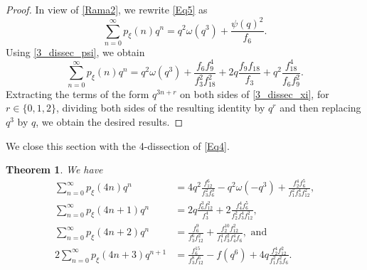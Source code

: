 \documentclass[12pt]{article}
\newtheorem{theorem}{Theorem}[section]
\begin{document}
\begin{proof}
In view of \eqref{Rama2}, we rewrite \eqref{Eq5} as
\begin{equation*}
\sum_{n=0}^{\infty} p_{\xi}(n)q^n = q^2\omega(q^3) + \frac{\psi(q)^2}{f_6}.
\end{equation*}
Using \eqref{3_dissec_psi}, we obtain 
\begin{equation}
\sum_{n=0}^{\infty} p_{\xi}(n)q^n = q^2\omega(q^3) + \frac{f_{6}f_{9}^4}{f_{3}^2f_{18}^2} +2q\frac{f_{9}f_{18}}{f_{3}} + q^2\frac{f_{18}^4}{f_6f_{9}^2}.
\label{3_dissec_xi}
\end{equation}	
Extracting the terms of the form $q^{3n+r}$ on both sides of \eqref{3_dissec_xi}, for $r \in \{0,1,2\}$, dividing both sides of the resulting identity by $q^r$ and then replacing $q^3$ by $q$, we obtain the desired results.
\end{proof}

We close this section with the 4-dissection of \eqref{Eq4}. 

\begin{theorem} We have
	\begin{align}
	\sum_{n=0}^{\infty} p_{\xi}(4n)q^n & = 4q^2\frac{f_{12}^6}{f_{3}^2f_{6}^3} - q^2 \omega(-q^3) + \frac{f_2^4f_6^5}{f_1^2f_3^4f_{12}^2}, \label{xi_4n} \\
	\sum_{n=0}^{\infty} p_{\xi}(4n+1)q^n & = 2q\frac{f_{6}^3f_{12}^2}{f_{3}^4} + 2\frac{f_{4}^4f_{6}^5}{f_{2}^2f_{3}^4f_{12}^2}, \label{xi_4n+1} \\
	\sum_{n=0}^{\infty} p_{\xi}(4n+2)q^n & = \frac{f_{6}^9}{f_{3}^6f_{12}^2} +\frac{f_{2}^{10}f_{12}^2}{f_{1}^4f_{3}^2f_{4}^4f_{6}}, \textrm{\ \ and} \label{xi_4n+2} \\
	2\sum_{n=0}^{\infty} p_{\xi}(4n+3)q^{n+1} & = \frac{f_{6}^{15}}{f_3^8f_{12}^6} - f(q^6) + 4q\frac{f_{2}^4f_{12}^2}{f_{1}^2f_{3}^2f_{6}}. \label{xi_4n+3}
	\end{align}
	\label{T6}
\end{theorem}
\end{document}
